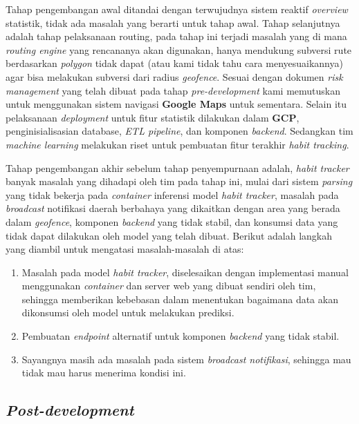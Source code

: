 Tahap pengembangan awal ditandai dengan terwujudnya sistem reaktif \textit{overview} statistik, tidak ada masalah yang berarti untuk tahap awal. Tahap selanjutnya adalah tahap pelaksanaan routing, pada tahap ini terjadi masalah yang di mana \textit{routing engine} yang rencananya akan digunakan, hanya mendukung subversi rute berdasarkan \textit{polygon} tidak dapat (atau kami tidak tahu cara menyesuaikannya) agar bisa melakukan subversi dari radius \textit{geofence}. Sesuai dengan dokumen \textit{risk management} yang telah dibuat pada tahap \textit{pre-development} kami memutuskan untuk menggunakan sistem navigasi \textbf{Google Maps} untuk sementara. Selain itu pelaksanaan \textit{deployment} untuk fitur statistik dilakukan dalam \textbf{GCP}, penginisialisasian database, \textit{ETL pipeline}, dan komponen \textit{backend}. Sedangkan tim \textit{machine learning} melakukan riset untuk pembuatan fitur terakhir \textit{habit tracking}.

Tahap pengembangan akhir sebelum tahap penyempurnaan adalah, \textit{habit tracker} banyak masalah yang dihadapi oleh tim pada tahap ini, mulai dari sistem \textit{parsing} yang tidak bekerja pada \textit{container} inferensi model \textit{habit tracker}, masalah pada \textit{broadcast} notifikasi daerah berbahaya yang dikaitkan dengan area yang berada dalam \textit{geofence}, komponen \textit{backend} yang tidak stabil, dan konsumsi data yang tidak dapat dilakukan oleh model yang telah dibuat. Berikut adalah langkah yang diambil untuk mengatasi masalah-masalah di atas:
\begin{enumerate}
    \item Masalah pada model \textit{habit tracker}, diselesaikan dengan implementasi manual menggunakan \textit{container} dan server web yang dibuat sendiri oleh tim, sehingga memberikan kebebasan dalam menentukan bagaimana data akan dikonsumsi oleh model untuk melakukan prediksi.
    \item Pembuatan \textit{endpoint} alternatif untuk komponen \textit{backend} yang tidak stabil.
    \item Sayangnya masih ada masalah pada sistem \textit{broadcast notifikasi}, sehingga mau tidak mau harus menerima kondisi ini.
\end{enumerate}

\subsection{\textit{Post-development}}

